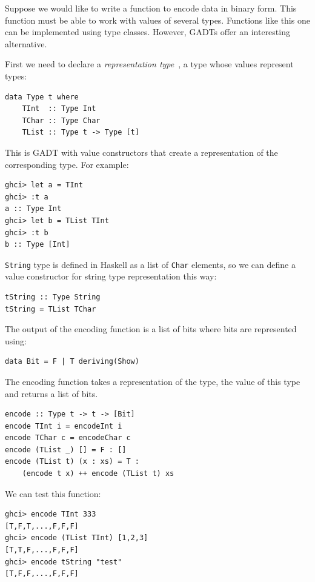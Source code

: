 \documentclass{tmr}
\newcommand{\italic}[1]{\textit{#1}}
\begin{document}
Suppose we would like to write a function to encode data in binary form. This function must be able to work with values of several types. Functions like this one can be implemented using type classes. However, GADTs offer an interesting alternative.

First we need to declare a \italic{representation type}~\cite{replib}, a type whose values represent types:

\begin{Verbatim}
data Type t where
    TInt  :: Type Int
    TChar :: Type Char
    TList :: Type t -> Type [t]
\end{Verbatim}

This is GADT with value constructors that create a representation of the corresponding type. For example:

\begin{Verbatim}
ghci> let a = TInt
ghci> :t a
a :: Type Int
ghci> let b = TList TInt
ghci> :t b
b :: Type [Int]
\end{Verbatim}

\verb|String| type is defined in Haskell as a list of \verb|Char| elements, so we can define a value constructor for string type representation this way:

\begin{Verbatim}
tString :: Type String
tString = TList TChar
\end{Verbatim}

The output of the encoding function is a list of bits where bits are represented using:

\begin{Verbatim}
data Bit = F | T deriving(Show)
\end{Verbatim}

The encoding function takes a representation of the type, the value of this type and returns a list of bits.

\begin{Verbatim}
encode :: Type t -> t -> [Bit]
encode TInt i = encodeInt i
encode TChar c = encodeChar c
encode (TList _) [] = F : []
encode (TList t) (x : xs) = T :
    (encode t x) ++ encode (TList t) xs
\end{Verbatim}

We can test this function:

\begin{Verbatim}
ghci> encode TInt 333
[T,F,T,...,F,F,F]
ghci> encode (TList TInt) [1,2,3]
[T,T,F,...,F,F,F]
ghci> encode tString "test"
[T,F,F,...,F,F,F]
\end{Verbatim}
\end{document}
